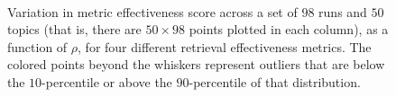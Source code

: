 \begin{figure}[t!]
\centering
{}
\\
\caption{Variation in metric effectiveness score across a set of $98$
runs and $50$ topics (that is, there are $50 \times 98$ points
plotted in each column), as a function of $\rho$, for four different
retrieval effectiveness metrics.
The colored points beyond the whiskers represent outliers that are
below the $10$-percentile or above the $90$-percentile of that
distribution.
\label{fig-score-variation}}
\end{figure}

